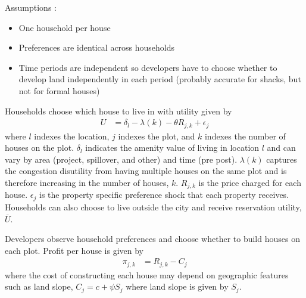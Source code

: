 \documentclass[12pt]{article}
\begin{document}
Assumptions :
\begin{itemize}
\item One household per house
\item Preferences are identical across households
\item Time periods are independent so developers have to choose whether to develop land independently in each period (probably accurate for shacks, but not for formal houses)
\end{itemize}

Households choose which house to live in with utility given by
\begin{align*}
U &= \delta_{l} - \lambda(k) - \theta R_{j,k}   + \epsilon_j  
\end{align*}
\noindent where $l$ indexes the location, $j$ indexes the plot, and $k$ indexes the number of houses on the plot.  $\delta_{l}$ indicates the amenity value of living in location $l$ and can vary by area (project, spillover, and other) and time (pre post).  $\lambda(k)$ captures the congestion disutility from having multiple houses on the same plot and is therefore increasing in the number of houses, $k$.  $R_{j,k}$ is the price charged for each house.  $\epsilon_j$ is the property specific preference shock that each property receives.  Households can also choose to live outside the city and receive reservation utility, $\overline{U}$.  

Developers observe household preferences and choose whether to build houses on each plot.  Profit per house is given by
\begin{align*}
\pi_{j,k} &= R_{j,k} - C_{j} 
\end{align*}
\noindent where the cost of constructing each house may depend on geographic features such as land slope, $C_{j} = c + \psi S_{j}$ where land slope is given by $S_{j}$.
\end{document}
